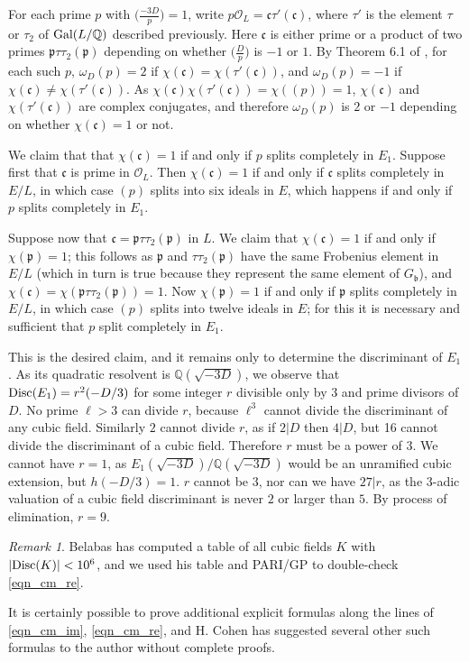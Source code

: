 \documentclass[12pt]{amsart}
\theoremstyle{remark}
\newtheorem*{remark}{Remark}
\numberwithin{theorem}{section} \numberwithin{equation}{section}
\newcommand{\calO}{\mathcal{O}}
\newcommand{\mfp}{\mathfrak{p}}
\newcommand{\mfb}{\mathfrak{b}}
\newcommand{\mfc}{\mathfrak{c}}
\newcommand{\Q}{\mathbb{Q}}
\newcommand{\Gal}{{\text {\rm Gal}}}
\newcommand{\Disc}{\textnormal{Disc}}
\begin{document}
For each prime $p$ with $\big( \frac{-3D}{p} \big) = 1$, write $p \calO_L = \mfc \tau'(\mfc)$, where $\tau'$ is the element
$\tau$ or $\tau_2$ of $\Gal(L/\Q)$ described previously. Here $\mfc$ is either prime or a product of two primes $\mfp \tau \tau_2(\mfp)$ 
depending on whether
$\big( \frac{D}{p} \big)$ is $-1$ or $1$.
By Theorem 6.1 of \cite{CM}, for each such $p$,
$\omega_D(p) = 2$ if $\chi(\mfc) = \chi(\tau'(\mfc))$, and $\omega_D(p) = -1$ if  $\chi(\mfc) \neq \chi(\tau'(\mfc))$.
As $\chi(\mfc) \chi(\tau'(\mfc)) = \chi((p)) = 1$, 
$\chi(\mfc)$ and $\chi(\tau'(\mfc))$ are complex conjugates, and therefore
$\omega_D(p)$ is $2$ or $-1$ depending on whether $\chi(\mfc) = 1$ or not.

We claim that that $\chi(\mfc) = 1$ if and only if $p$ splits completely in $E_1$. Suppose first that
$\mfc$ is prime in $\calO_L$. Then $\chi(\mfc) = 1$ if and only if $\mfc$ splits completely in
$E/L$, in which case $(p)$ splits into six ideals in $E$, which happens
if and only if $p$ splits completely
in $E_1$.

Suppose now that $\mfc = \mfp \tau \tau_2(\mfp)$ in $L$. We claim that $\chi(\mfc) = 1$ if and only if
$\chi(\mfp) = 1$; this follows 
as $\mfp$ and $\tau \tau_2(\mfp)$ have the same Frobenius element in $E/L$ (which in turn is true because
they represent the same element of $G_{\mfb}$), and $\chi(\mfc) = \chi(\mfp \tau \tau_2(\mfp)) = 1$.
Now $\chi(\mfp) = 1$ if and only if $\mfp$ splits completely in $E/L$, in which case $(p)$ splits into twelve ideals
in $E$; for this it is necessary and sufficient that $p$ split completely in $E_1$.

This is the desired claim, and it remains only to determine the discriminant of $E_1$. As its quadratic resolvent is
$\Q(\sqrt{-3D})$, we observe that  $\Disc(E_1) = r^2 (-D/3)$ for some integer $r$ divisible only by $3$ and prime divisors of $D$.
No prime $\ell > 3$ can divide $r$, because $\ell^3$ cannot divide the discriminant of any cubic field. Similarly $2$
cannot divide $r$, as if $2 | D$ then $4 | D$, but 16 cannot divide the discriminant of a cubic field. Therefore $r$ must
be a power of 3. We cannot have $r = 1$, as $E_1(\sqrt{-3D})/\Q(\sqrt{-3D})$ would be an unramified cubic extension,
but $h(-D/3) = 1$. $r$ cannot be $3$, nor can we have $27 | r$, as the $3$-adic valuation of a cubic field discriminant
is never $2$ or larger than $5$. By process of elimination, $r = 9$.

\begin{remark}
Belabas \cite{bel} has computed a table of all cubic fields $K$ with $|\Disc(K)| < 10^6$, and
we used his table and PARI/GP \cite{pari} to double-check \eqref{eqn_cm_re}. 

It is certainly possible to prove additional explicit formulas along the lines of \eqref{eqn_cm_im}, \eqref{eqn_cm_re},
and H. Cohen \cite{cohen} has suggested several other such formulas to the author without complete proofs.
\end{remark}
\end{document}

